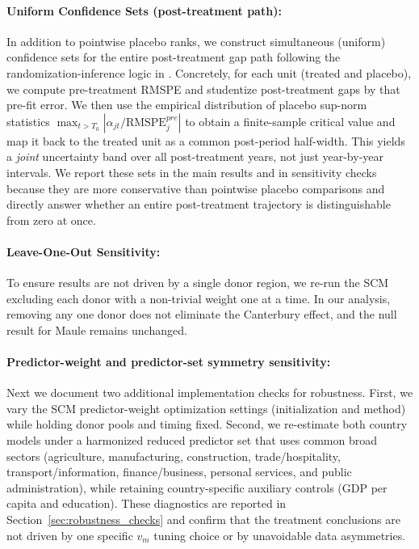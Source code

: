 \documentclass[12pt]{article}
\begin{document}
\paragraph{Uniform Confidence Sets (post-treatment path):} In addition to pointwise placebo ranks, we construct simultaneous (uniform) confidence sets for the entire post-treatment gap path following the randomization-inference logic in \textcite{firpo2018synthetic}. Concretely, for each unit (treated and placebo), we compute pre-treatment RMSPE and studentize post-treatment gaps by that pre-fit error. We then use the empirical distribution of placebo sup-norm statistics $\max_{t>T_0} |\alpha_{jt}/\text{RMSPE}^{pre}_j|$ to obtain a finite-sample critical value and map it back to the treated unit as a common post-period half-width. This yields a \emph{joint} uncertainty band over all post-treatment years, not just year-by-year intervals. We report these sets in the main results and in sensitivity checks because they are more conservative than pointwise placebo comparisons and directly answer whether an entire post-treatment trajectory is distinguishable from zero at once.

\paragraph{Leave-One-Out Sensitivity:} To ensure results are not driven by a single donor region, we re-run the SCM excluding each donor with a non-trivial weight one at a time. In our analysis, removing any one donor does not eliminate the Canterbury effect, and the null result for Maule remains unchanged.

\paragraph{Predictor-weight and predictor-set symmetry sensitivity:} Next we document two additional implementation checks for robustness. First, we vary the SCM predictor-weight optimization settings (initialization and method) while holding donor pools and timing fixed. Second, we re-estimate both country models under a harmonized reduced predictor set that uses common broad sectors (agriculture, manufacturing, construction, trade/hospitality, transport/information, finance/business, personal services, and public administration), while retaining country-specific auxiliary controls (GDP per capita and education). These diagnostics are reported in Section~\ref{sec:robustness_checks} and confirm that the treatment conclusions are not driven by one specific $v_m$ tuning choice or by unavoidable data asymmetries.
\end{document}
